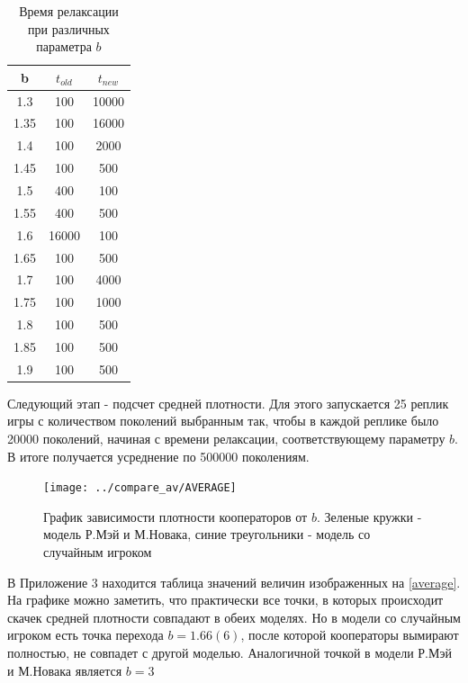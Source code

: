 \documentclass[12pt,a4paper]{article}
\begin{document}
	
	\vspace{10px}
	\begin{center}
	\begin{table}[H]
	\centering
		\begin{tabular}[H]{|c|c|c|}
			\hline 
			b&$t_{old}$& $t_{new} $ \\
			\hline 
			1.3& 100 & 10000 \\ 
			\hline 
			1.35& 100 & 16000 \\ 
			\hline 
			1.4& 100 & 2000 \\ 
			\hline 
			1.45& 100 & 500 \\ 
			\hline 
			1.5& 400 & 100 \\ 
			\hline 
			1.55& 400 & 500 \\ 
			\hline 
			1.6& 16000 & 100 \\ 
			\hline 
			1.65& 100 & 500 \\ 
			\hline 
			1.7& 100 & 4000 \\ 
			\hline 
			1.75& 100 & 1000 \\ 
			\hline 
			1.8& 100 & 500 \\ 
			\hline 
			1.85& 100 & 500 \\ 
			\hline 
			1.9& 100 & 500 \\ 
			\hline 
		\end{tabular}
		\label{tab1}
		\caption{Время релаксации при различных параметра $b$}
	\end{table}
	\end{center}	

	\par Следующий этап - подсчет средней плотности. Для этого запускается 25 реплик игры с количеством поколений выбранным так, чтобы в каждой реплике было 20000 поколений, начиная с времени релаксации, соответствующему параметру $b$. В итоге получается усреднение по 500000 поколениям. 
	
	\begin{figure}
			\centering
			\texttt{[image: ../compare\_av/AVERAGE]}
			\caption{График зависимости плотности кооператоров от $b$. Зеленые кружки - модель Р.Мэй и М.Новака, синие треугольники - модель со случайным игроком}
			\label{fig:average}
	\end{figure}
	
	В Приложение 3 находится таблица значений величин изображенных на \ref{average}. На графике можно заметить, что практически все точки, в которых происходит скачек средней плотности совпадают в обеих моделях. Но в модели со случайным игроком есть точка перехода $b=1.66(6)$, после которой кооператоры вымирают полностью, не совпадет с другой моделью. Аналогичной точкой в модели Р.Мэй и М.Новака является $b=3$
	
\end{document}
